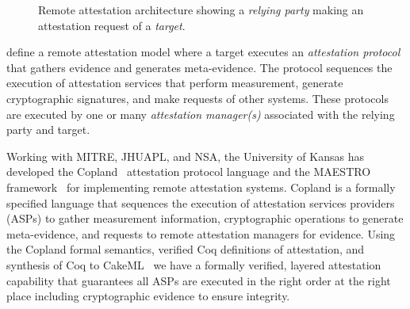 \documentclass[runningheads]{llncs}
\begin{document}
\begin{figure}[hbtp]
  \centering
  \caption{Remote attestation architecture
  showing a \emph{relying party} making an attestation request of a
  \emph{target}.}
  \label{fig:remote-attestation}
\end{figure}

\citet{Coker::Principles-of-R,Coker:08:Attestation:-Ev} define a
remote attestation model where a target executes an \emph{attestation
  protocol} that gathers evidence and generates meta-evidence.  The
protocol sequences the execution of attestation services that perform
measurement, generate cryptographic signatures, and make requests of
other systems.  These protocols are executed by one or many \emph{attestation
  manager(s)} associated with the relying party and target.

Working with MITRE, JHUAPL, and NSA, the University of Kansas has
developed the Copland~\citep{Ramsdell:2019aa} attestation protocol language
and the MAESTRO framework~\citep{petz2022innovations} for implementing
remote attestation systems. Copland is a formally specified language
that sequences the execution of attestation services providers (ASPs)
to gather measurement information, cryptographic operations to
generate meta-evidence, and requests to remote attestation managers
for evidence. Using the Copland formal semantics, verified Coq
definitions of attestation, and synthesis of Coq to
CakeML~\citep{Kumar:2014:CVI:2535838.2535841} we have a formally
verified, layered attestation capability that guarantees all ASPs are
executed in the right order at the right place including cryptographic
evidence to ensure integrity.
\end{document}

